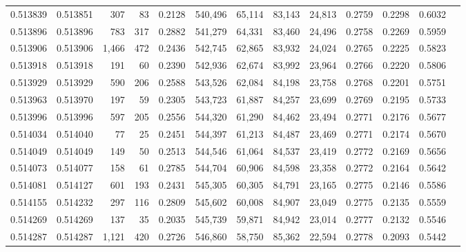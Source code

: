 \begin{tabular}{rrrrrrrrrrrrr}
0.513839 & 0.513851 &   307 &    83 &                                     0.2128 & 540,496 &  65,114 &  83,143 &  24,813 & 0.2759 & 0.2298 & 0.6032 \\
0.513896 & 0.513896 &   783 &   317 &                                     0.2882 & 541,279 &  64,331 &  83,460 &  24,496 & 0.2758 & 0.2269 & 0.5959 \\
0.513906 & 0.513906 & 1,466 &   472 &                                     0.2436 & 542,745 &  62,865 &  83,932 &  24,024 & 0.2765 & 0.2225 & 0.5823 \\
0.513918 & 0.513918 &   191 &    60 &                                     0.2390 & 542,936 &  62,674 &  83,992 &  23,964 & 0.2766 & 0.2220 & 0.5806 \\
0.513929 & 0.513929 &   590 &   206 &                                     0.2588 & 543,526 &  62,084 &  84,198 &  23,758 & 0.2768 & 0.2201 & 0.5751 \\
0.513963 & 0.513970 &   197 &    59 &                                     0.2305 & 543,723 &  61,887 &  84,257 &  23,699 & 0.2769 & 0.2195 & 0.5733 \\
0.513996 & 0.513996 &   597 &   205 &                                     0.2556 & 544,320 &  61,290 &  84,462 &  23,494 & 0.2771 & 0.2176 & 0.5677 \\
0.514034 & 0.514040 &    77 &    25 &                                     0.2451 & 544,397 &  61,213 &  84,487 &  23,469 & 0.2771 & 0.2174 & 0.5670 \\
0.514049 & 0.514049 &   149 &    50 &                                     0.2513 & 544,546 &  61,064 &  84,537 &  23,419 & 0.2772 & 0.2169 & 0.5656 \\
0.514073 & 0.514077 &   158 &    61 &                                     0.2785 & 544,704 &  60,906 &  84,598 &  23,358 & 0.2772 & 0.2164 & 0.5642 \\
0.514081 & 0.514127 &   601 &   193 &                                     0.2431 & 545,305 &  60,305 &  84,791 &  23,165 & 0.2775 & 0.2146 & 0.5586 \\
0.514155 & 0.514232 &   297 &   116 &                                     0.2809 & 545,602 &  60,008 &  84,907 &  23,049 & 0.2775 & 0.2135 & 0.5559 \\
0.514269 & 0.514269 &   137 &    35 &                                     0.2035 & 545,739 &  59,871 &  84,942 &  23,014 & 0.2777 & 0.2132 & 0.5546 \\
0.514287 & 0.514287 & 1,121 &   420 &                                     0.2726 & 546,860 &  58,750 &  85,362 &  22,594 & 0.2778 & 0.2093 & 0.5442 \\

\end{tabular}
